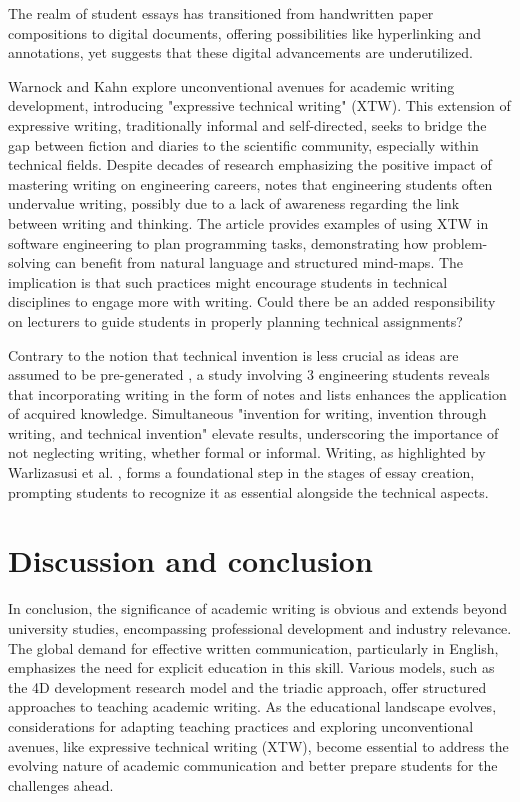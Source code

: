 \documentclass[a4paper,12pt]{article}
\begin{document}
The realm of student essays has transitioned from handwritten paper compositions to digital documents, offering possibilities like hyperlinking and annotations, yet \cite{Source1} suggests that these digital advancements are underutilized.

Warnock and Kahn \cite{Source6} explore unconventional avenues for academic writing development, introducing "expressive technical writing" (XTW). This extension of expressive writing, traditionally informal and self-directed, seeks to bridge the gap between fiction and diaries to the scientific community, especially within technical fields. Despite decades of research emphasizing the positive impact of mastering writing on engineering careers, \cite{Source6} notes that engineering students often undervalue writing, possibly due to a lack of awareness regarding the link between writing and thinking. The article provides examples of using XTW in software engineering to plan programming tasks, demonstrating how problem-solving can benefit from natural language and structured mind-maps. The implication is that such practices might encourage students in technical disciplines to engage more with writing. Could there be an added responsibility on lecturers to guide students in properly planning technical assignments?

Contrary to the notion that technical invention is less crucial as ideas are assumed to be pre-generated \cite{Source7}, a study involving 3 engineering students \cite{Source7} reveals that incorporating writing in the form of notes and lists enhances the application of acquired knowledge. Simultaneous "invention for writing, invention through writing, and technical invention" elevate results, underscoring the importance of not neglecting writing, whether formal or informal. Writing, as highlighted by Warlizasusi et al. \cite{Source4}, forms a foundational step in the stages of essay creation, prompting students to recognize it as essential alongside the technical aspects.

\section{Discussion and conclusion}

In conclusion, the significance of academic writing is obvious and extends beyond university studies, encompassing professional development and industry relevance. The global demand for effective written communication, particularly in English, emphasizes the need for explicit education in this skill. Various models, such as the 4D development research model and the triadic approach, offer structured approaches to teaching academic writing. As the educational landscape evolves, considerations for adapting teaching practices and exploring unconventional avenues, like expressive technical writing (XTW), become essential to address the evolving nature of academic communication and better prepare students for the challenges ahead.
\end{document}
